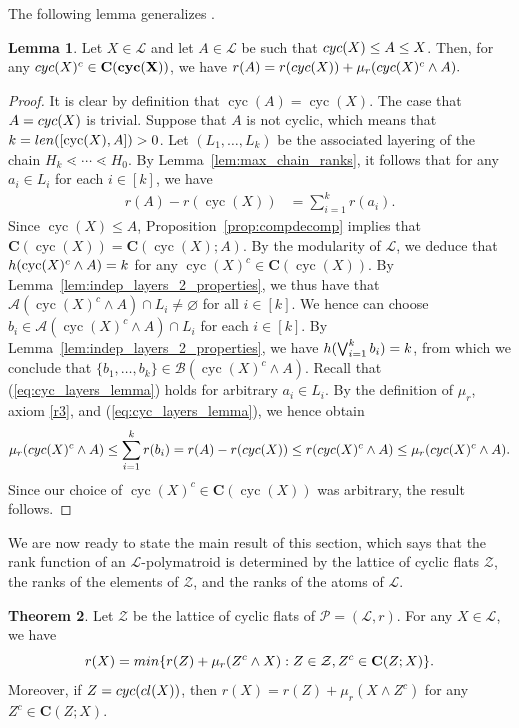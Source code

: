 \documentclass[a4paper,11pt,reqno]{article}
\theoremstyle{definition}
\newtheorem{theorem}{Theorem}[section]
\newtheorem{lemma}[theorem]{{{Lemma}}}
\newcommand{\mL}{\mathcal{L}}
\newcommand{\mP}{\mathcal{P}}
\newcommand{\mZ}{\mathcal{Z}}
\newcommand{\len}{\textup{len}}
\newcommand{\cC}{\textup{\bf{C}}}
\DeclareMathOperator{\cyc}{cyc}
\begin{document}
The following lemma generalizes \cite[Lemma 1]{Csirm20}.

\begin{lemma}\label{lem:cyc_rank_identity}
    Let $X \in \mL$ and let $A\in\mathcal{L}$ be such that $\textup{cyc}(X)\leq A\leq X$. Then, for any $\textup{cyc}(X)^c\in \cC(\textup{cyc}(X))$, we have
    \(
    r(A) = r(\textup{cyc}(X))+\mu_r(\textup{cyc}(X)^c\wedge A).
    \)
\end{lemma}

\begin{proof}
    It is clear by definition that $\cyc(A)=\cyc(X)$. The case that $A=\textup{cyc}(X)$ is trivial. Suppose that $A$ is not cyclic, which means that $k=\len([\cyc(X),A])>0$. Let $(L_1,\dots,L_k)$ be the associated layering of the chain $H_k \lessdot \cdots \lessdot H_0$. By Lemma~\ref{lem:max_chain_ranks}, it follows that for any $a_i\in L_i$ for each $i\in[k]$, we have
    \begin{align}
        r(A)-r(\cyc(X)) &= \sum_{i=1}^{k}r(a_i)\label{eq:cyc_layers_lemma}.
    \end{align}
    Since $\cyc(X)\leq A$, Proposition~\ref{prop:compdecomp} implies that $\mathbf{C}(\cyc(X))=\mathbf{C}(\cyc(X);A)$. By the modularity of $\mathcal{L}$, we deduce that $\textup{h}(\cyc(X)^c\wedge A)=k$ for any $\cyc(X)^c\in\mathbf{C}(\cyc(X))$. By Lemma~\ref{lem:indep_layers_2_properties}, we thus have that $\mathcal{A}(\cyc(X)^c\wedge A)\cap L_i\neq\varnothing$ for all $i\in[k]$. We hence can choose $b_i\in\mathcal{A}(\cyc(X)^c\wedge A)\cap L_i$ for each $i\in[k]$. By Lemma~\ref{lem:indep_layers_2_properties}, we have $\textup{h}(\bigvee_{i=1}^kb_i)=k$, from which we conclude that $\{b_1,\dots,b_k\}\in\mathcal{B}(\cyc(X)^c\wedge A)$. Recall that (\ref{eq:cyc_layers_lemma}) holds for arbitrary $a_i\in L_i$. By the definition of $\mu_r$, axiom \ref{r3}, and (\ref{eq:cyc_layers_lemma}), we hence obtain
    \[
    \mu_r(\textup{cyc}(X)^c\wedge A)\leq\displaystyle\sum_{i=1}^{k}r(b_i)=r(A)-r(\textup{cyc}(X))\leq r(\textup{cyc}(X)^c\wedge A)\leq\mu_r(\textup{cyc}(X)^c\wedge A).
    \]
    Since our choice of $\cyc(X)^c\in\mathbf{C}(\cyc(X))$ was arbitrary, the result follows.
\end{proof}

We are now ready to state the main result of this section, which says that the rank function of an $\mL$-polymatroid is determined by the lattice of cyclic flats $\mZ$, the ranks of the elements of $\mZ$, and the ranks of the atoms of $\mathcal{L}$.

\begin{theorem}\label{thm:convol_identity}
    Let $\mathcal{Z}$ be the lattice of cyclic flats of $\mP=(\mathcal{L},r)$. For any $X\in\mathcal{L}$, we have 
    \[
       r(X)=\textup{min}\{r(Z)+\mu_r(Z^c\wedge X):Z\in\mathcal{Z}, Z^c\in \mathbf{C}(Z;X)\}.
    \]   
    Moreover, if $Z=\textup{cyc}(\textup{cl}(X))$, then
    \(r(X)=r(Z)+\mu_r(X\wedge Z^c)\) for any $Z^c\in\mathbf{C}(Z;X)$.
\end{theorem}
\end{document}
